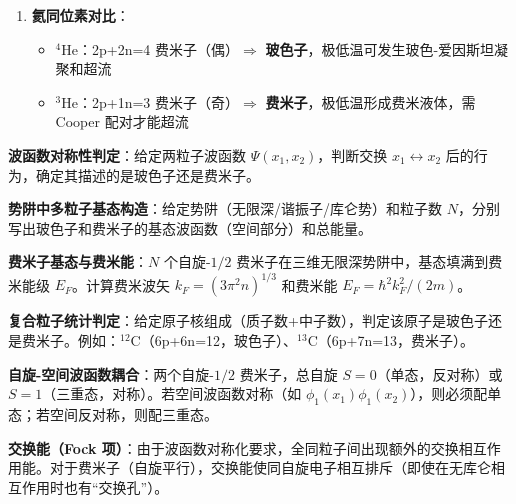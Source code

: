 \begin{formulabox}[核心公式]
\begin{enumerate}[label=\textbf{(\arabic*)}]
    \item \textbf{氦同位素对比}：
    \begin{itemize}[nosep]
        \item $^4$He：2p+2n=4 费米子（偶）$\Rightarrow$ \textbf{玻色子}，极低温可发生玻色-爱因斯坦凝聚和超流
        \item $^3$He：2p+1n=3 费米子（奇）$\Rightarrow$ \textbf{费米子}，极低温形成费米液体，需 Cooper 配对才能超流
    \end{itemize}
\end{enumerate}
\end{formulabox}

\begin{drillbox}[训练点与考法变体]
 \textbf{波函数对称性判定}：给定两粒子波函数 $\Psi(x_1,x_2)$，判断交换 $x_1\leftrightarrow x_2$ 后的行为，确定其描述的是玻色子还是费米子。

 \textbf{势阱中多粒子基态构造}：给定势阱（无限深/谐振子/库仑势）和粒子数 $N$，分别写出玻色子和费米子的基态波函数（空间部分）和总能量。

 \textbf{费米子基态与费米能}：$N$ 个自旋-$1/2$ 费米子在三维无限深势阱中，基态填满到费米能级 $E_F$。计算费米波矢 $k_F=(3\pi^2n)^{1/3}$ 和费米能 $E_F=\hbar^2k_F^2/(2m)$。

 \textbf{复合粒子统计判定}：给定原子核组成（质子数+中子数），判定该原子是玻色子还是费米子。例如：$^{12}$C（6p+6n=12，玻色子）、$^{13}$C（6p+7n=13，费米子）。

 \textbf{自旋-空间波函数耦合}：两个自旋-$1/2$ 费米子，总自旋 $S=0$（单态，反对称）或 $S=1$（三重态，对称）。若空间波函数对称（如 $\phi_1(x_1)\phi_1(x_2)$），则必须配单态；若空间反对称，则配三重态。

 \textbf{交换能（Fock 项）}：由于波函数对称化要求，全同粒子间出现额外的交换相互作用能。对于费米子（自旋平行），交换能使同自旋电子相互排斥（即使在无库仑相互作用时也有``交换孔''）。
\end{drillbox}

